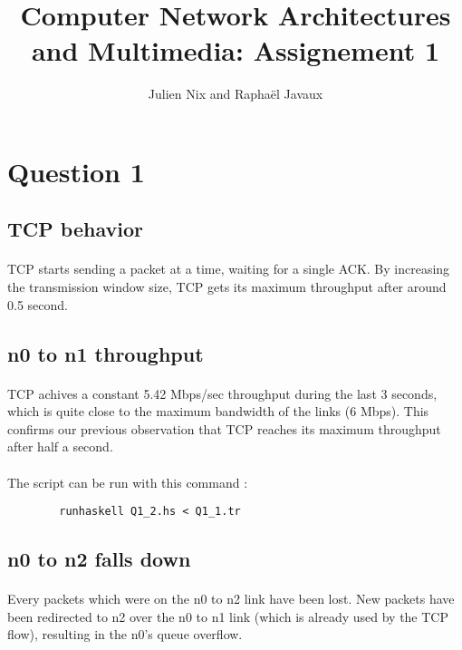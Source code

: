 \documentclass[a4paper]{article}
\title{Computer Network Architectures and Multimedia: Assignement 1}
\author{Julien Nix and Raphaël Javaux}
\date{}
\begin{document}
\maketitle

 \section{Question 1}

   \subsection{TCP behavior}

    \paragraph{}TCP starts sending a packet at a time, waiting for a single ACK.
By increasing the transmission window size, TCP gets its maximum throughput
after around 0.5 second.

   \subsection{n0 to n1 throughput}

    \paragraph{}TCP achives a constant 5.42 Mbps/sec throughput during the last
3 seconds, which is quite close to the maximum bandwidth of the links (6 Mbps).
This confirms our previous observation that TCP reaches its maximum throughput
after half a second.

    \paragraph{}The script can be run with this command :
    \begin{verbatim}
        runhaskell Q1_2.hs < Q1_1.tr
    \end{verbatim}

   \subsection{n0 to n2 falls down}

   \paragraph{}Every packets which were on the n0 to n2 link have been lost.
New packets have been redirected to n2 over the n0 to n1 link (which is already
used by the TCP flow), resulting in the n0's queue overflow.
\end{document}
